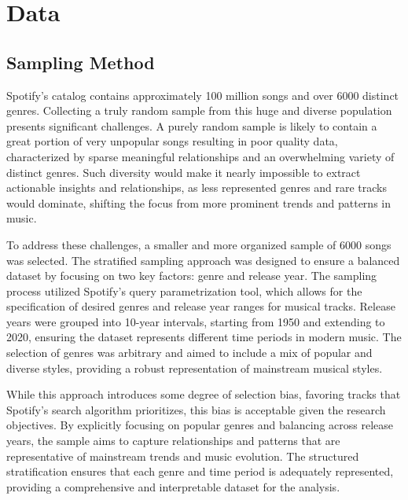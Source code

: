 \chapter{Data}
\label{cha:data}



\section{Sampling Method}
\label{sec:samplingmethod}


Spotify’s catalog contains approximately 100 million songs and over 6000
distinct genres. Collecting a truly random sample from this huge and diverse
population presents significant challenges. A purely random sample is likely to
contain a great portion of very unpopular songs resulting in poor quality data,
characterized by sparse meaningful relationships and an overwhelming variety of
distinct genres. Such diversity would make it nearly impossible to extract
actionable insights and relationships, as less represented genres and rare
tracks would dominate, shifting the focus from more prominent trends and
patterns in music.


To address these challenges, a smaller and more organized sample of 6000 songs
was selected. The stratified sampling approach was designed to ensure a
balanced dataset by focusing on two key factors: genre and release year. The
sampling process utilized Spotify's query parametrization tool, which allows
for the specification of desired genres and release year ranges for musical
tracks. Release years were grouped into 10-year intervals, starting from 1950
and extending to 2020, ensuring the dataset represents different time periods
in modern music. The selection of genres was arbitrary and aimed to include a
mix of popular and diverse styles, providing a robust representation of
mainstream musical styles.
 

While this approach introduces some degree of selection bias, favoring tracks
that Spotify's search algorithm prioritizes, this bias is acceptable given the
research objectives. By explicitly focusing on popular genres and balancing
across release years, the sample aims to capture relationships and patterns
that are representative of mainstream trends and music evolution. The
structured stratification ensures that each genre and time period is adequately
represented, providing a comprehensive and interpretable dataset for  the
analysis.


